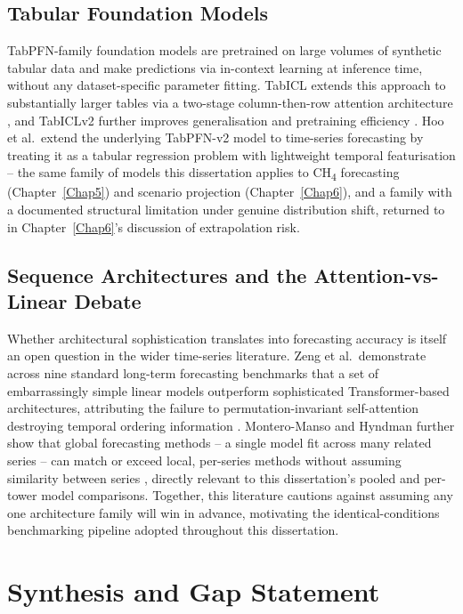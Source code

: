 \subsection{Tabular Foundation Models}

TabPFN-family foundation models are pretrained on large volumes of synthetic tabular data and make
predictions via in-context learning at inference time, without any dataset-specific parameter
fitting. TabICL extends this approach to substantially larger tables via a two-stage
column-then-row attention architecture \cite{qu2025tabicl}, and TabICLv2 further improves
generalisation and pretraining efficiency \cite{qu2026tabiclv2}. Hoo et al.\ extend the underlying
TabPFN-v2 model to time-series forecasting by treating it as a tabular regression problem with
lightweight temporal featurisation \cite{hoo2026tabpfnts} -- the same family of models this
dissertation applies to CH\textsubscript{4} forecasting (Chapter~\ref{Chap5}) and scenario
projection (Chapter~\ref{Chap6}), and a family with a documented structural limitation under
genuine distribution shift, returned to in Chapter~\ref{Chap6}'s discussion of extrapolation risk.

\subsection{Sequence Architectures and the Attention-vs-Linear Debate}

Whether architectural sophistication translates into forecasting accuracy is itself an open
question in the wider time-series literature. Zeng et al.\ demonstrate across nine standard
long-term forecasting benchmarks that a set of embarrassingly simple linear models outperform
sophisticated Transformer-based architectures, attributing the failure to permutation-invariant
self-attention destroying temporal ordering information \cite{zeng2023}. Montero-Manso and Hyndman
further show that global forecasting methods -- a single model fit across many related series --
can match or exceed local, per-series methods without assuming similarity between series
\cite{montero2021global}, directly relevant to this dissertation's pooled and per-tower model
comparisons. Together, this literature cautions against assuming any one architecture family will
win in advance, motivating the identical-conditions benchmarking pipeline adopted throughout this
dissertation.

\section{Synthesis and Gap Statement}

